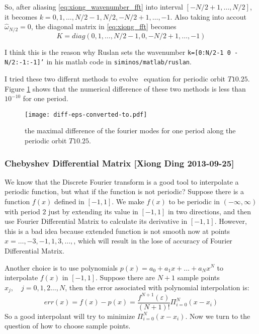 \begin{itemize}
 So, after aliasing \eqref{eq:xiong_wavenumber_fft} into interval $[-N/2+1,\dots,N/2]$,
 it becomes $k=0,1,\dots , N/2-1, N/2, -N/2+1,\dots, -1$. Also taking into accout
 $\hat{\omega}_{N/2}=0$, the diagonal matrix in \eqref{eq:xiong_fft} becomes
   \begin{equation}
  \label{eq:xiong_wavenumber_fft_matlab}
  K=diag(0,1,\dots, N/2-1, 0, -N/2+1,\dots, -1)
 \end{equation}

 I think this is the reason why Ruslan sets the wavenumber \texttt{k=[0:N/2-1 0 -N/2:-1:-1]'}
 in his matlab code in \texttt{siminos/matlab/ruslan}.

 \end{itemize}

 I tried these two differnt methods to
 evolve \KS\ equation for periodic orbit $T10.25$. Figure \ref{fig:xiong_sdmfft_dif} shows that
 the numerical difference of these two methods is less than $10^{-10}$ for one period.

 \begin{figure}[h]
 \centering
 \texttt{[image: diff-eps-converted-to.pdf]}
 \caption{the maximal difference of the fourier modes for one period along the periodic orbit
  $T10.25$.}
 \label{fig:xiong_sdmfft_dif}
\end{figure}

\clearpage

\subsubsection{Chebyshev Differential Matrix [Xiong Ding 2013-09-25]}
We know that the Discrete Fourier transform is a good tool to interpolate a periodic function,
 but what if the function is not periodic? Suppose there is a function $f(x)$ defined in $[-1,1]$.
 We make $f(x)$ to be periodic in
 $(-\infty, \infty)$ with period $2$ just by extending its value in $[-1,1]$ in two directions, and
 then use Fourier Differential Matrix to calculate its derivative in $[-1,1]$. However,
 this is a bad idea
 because extended function is not smooth now at points $x=\dots, -3,-1,1,3,\dots,$, which will result
 in the lose of accuracy of Fourier Differential Matrix.

 Another choice is to use polynomials $p(x)=a_{0}+a_{1}x+\dots+a_{N}x^{N}$ to interpolate $f(x)$
 in $[-1,1]$. Suppose there are $N+1$ sample points $x_{j},\quad j=0,1,2 \dots ,N$, then
 the error associated with polynomial interpolation is:
 \[
  err(x)=f(x)-p(x)=\frac{f^{N+1}(\varepsilon)}{(N+1)!}\Pi_{i=0}^{N}(x-x_{i})
 \]
 So a good interpolant will try to minimize $\Pi_{i=0}^{N}(x-x_{i})$.
 Now we turn to the question of how to choose sample points.

